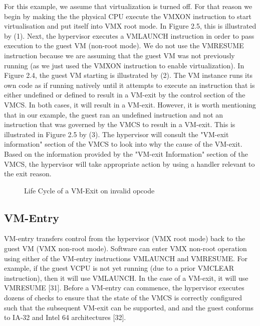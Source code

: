 \documentclass{report}
\begin{document}
\begin{spacing}{1.5}
{\large
For this example, we assume that virtualization is turned off. For that reason we begin by making the the physical CPU execute the VMXON instruction to start virtualisation and put itself into VMX root mode. In Figure 2.5, this is illustrated by (1). Next, the hypervisor executes a VMLAUNCH instruction in order to pass execution to the guest VM (non-root mode). We do not use the VMRESUME instruction because we are assuming that the guest VM was not previously running (as we just used the VMXON instruction to enable virtualization). In Figure 2.4, the guest VM starting is illustrated by (2). The VM instance runs its own code as if running natively until it attempts to execute an instruction that is either undefined or defined to result in a VM-exit by the control section of the VMCS. In both cases, it will result in a VM-exit. However, it is worth mentioning that in our example, the guest ran an undefined instruction and not an instruction that was governed by the VMCS to result in a VM-exit. This is illustrated in Figure 2.5 by (3). The hypervisor will consult the "VM-exit information" section of the VMCS to look into why the cause of the VM-exit. Based on the information provided by the "VM-exit Information" section of the VMCS, the hypervisor will take appropriate action by using a handler relevant to the exit reason.
\newline
}





\begin{figure}[ht]
    \centering
    \caption{Life Cycle of a VM-Exit on invalid opcode}
\end{figure}



\subsection{VM-Entry}
{\large
VM-entry transfers control from the hypervisor (VMX root mode) back to the guest VM (VMX non-root mode). Software can enter VMX non-root operation using either of the VM-entry instructions VMLAUNCH and VMRESUME. For example, if the guest VCPU is not yet running (due to a prior VMCLEAR instruction), then it will use VMLAUNCH. In the case of a VM-exit, it will use VMRESUME [31]. Before a VM-entry can commence, the hypervisor executes dozens of checks to ensure that the state of the VMCS is correctly configured such that the subsequent VM-exit can be supported, and and the guest conforms to IA-32 and Intel 64 architectures [32].
\newline
}


\end{spacing}
\end{document}
